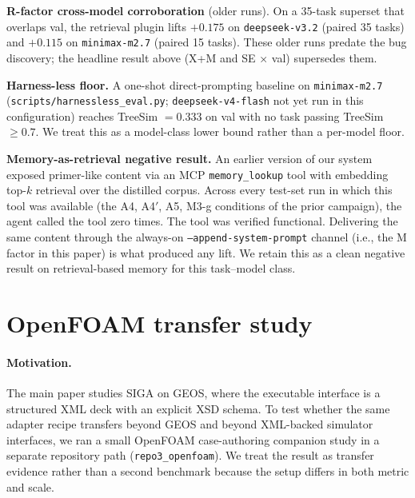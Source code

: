 \documentclass{article}
\begin{document}
\textbf{R-factor cross-model corroboration} (older runs). On a 35-task superset that overlaps val, the retrieval plugin lifts $+0.175$ on \texttt{deepseek-v3.2} (paired 35 tasks) and $+0.115$ on \texttt{minimax-m2.7} (paired 15 tasks). These older runs predate the bug discovery; the headline result above (X+M and SE × val) supersedes them.

\textbf{Harness-less floor.} A one-shot direct-prompting baseline on \texttt{minimax-m2.7} (\texttt{scripts/harnessless\_eval.py}; \texttt{deepseek-v4-flash} not yet run in this configuration) reaches TreeSim $= 0.333$ on val with no task passing TreeSim $\geq 0.7$. We treat this as a model-class lower bound rather than a per-model floor.

\textbf{Memory-as-retrieval negative result.} An earlier version of our system exposed primer-like content via an MCP \texttt{memory\_lookup} tool with embedding top-$k$ retrieval over the distilled corpus. Across every test-set run in which this tool was available (the A4, A4$'$, A5, M3-g conditions of the prior campaign), the agent called the tool zero times. The tool was verified functional. Delivering the same content through the always-on \texttt{--append-system-prompt} channel (i.e., the M factor in this paper) is what produced any lift. We retain this as a clean negative result on retrieval-based memory for this task--model class.

\section{OpenFOAM transfer study}
\label{app:openfoam-transfer}

\paragraph{Motivation.}
The main paper studies SIGA on GEOS, where the executable interface is a structured XML deck with an explicit XSD schema. To test whether the same adapter recipe transfers beyond GEOS and beyond XML-backed simulator interfaces, we ran a small OpenFOAM case-authoring companion study in a separate repository path (\texttt{repo3\_openfoam}). We treat the result as transfer evidence rather than a second benchmark because the setup differs in both metric and scale.
\end{document}
